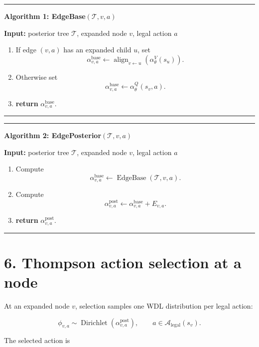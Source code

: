 \documentclass[11pt]{article}
\newcommand{\Dir}{\operatorname{Dirichlet}}
\newcommand{\Tree}{\mathcal{T}}
\newcommand{\Legal}{\mathcal{A}_{\mathrm{legal}}}
\newcommand{\Align}{\operatorname{align}}
\newcommand{\EdgeBase}{\operatorname{EdgeBase}}
\newenvironment{algorithmblock}[1]
{
  \par\medskip
  \noindent\hrule\par\smallskip
  \noindent\textbf{#1}
  \par\smallskip
}
{
  \par\smallskip\noindent\hrule\par\medskip
}
\newcommand{\Input}{\textbf{Input: }}
\newcommand{\Return}{\textbf{return }}
\begin{document}
\begin{algorithmblock}{Algorithm 1: EdgeBase\((\Tree,v,a)\)}

\Input posterior tree \(\Tree\), expanded node \(v\), legal action \(a\)

\begin{enumerate}[leftmargin=2em]
  \item If edge \((v,a)\) has an expanded child \(u\), set
  \[
  \alpha^{\mathrm{base}}_{v,a}
  \gets
  \Align_{v \leftarrow u}
  \left(
  \alpha_\theta^V(s_u)
  \right).
  \]

  \item Otherwise set
  \[
  \alpha^{\mathrm{base}}_{v,a}
  \gets
  \alpha_\theta^Q(s_v,a).
  \]

  \item \Return \(\alpha^{\mathrm{base}}_{v,a}\).
\end{enumerate}

\end{algorithmblock}

\begin{algorithmblock}{Algorithm 2: EdgePosterior\((\Tree,v,a)\)}

\Input posterior tree \(\Tree\), expanded node \(v\), legal action \(a\)

\begin{enumerate}[leftmargin=2em]
  \item Compute
  \[
  \alpha^{\mathrm{base}}_{v,a}
  \gets
  \EdgeBase(\Tree,v,a).
  \]

  \item Compute
  \[
  \alpha^{\mathrm{post}}_{v,a}
  \gets
  \alpha^{\mathrm{base}}_{v,a}
  +
  E_{v,a}.
  \]

  \item \Return \(\alpha^{\mathrm{post}}_{v,a}\).
\end{enumerate}

\end{algorithmblock}

\section*{6. Thompson action selection at a node}

At an expanded node \(v\), selection samples one WDL distribution per legal
action:

\[
\phi_{v,a}
\sim
\Dir
\left(
\alpha^{\mathrm{post}}_{v,a}
\right),
\qquad
 a \in \Legal(s_v).
\]

The selected action is
\end{document}
